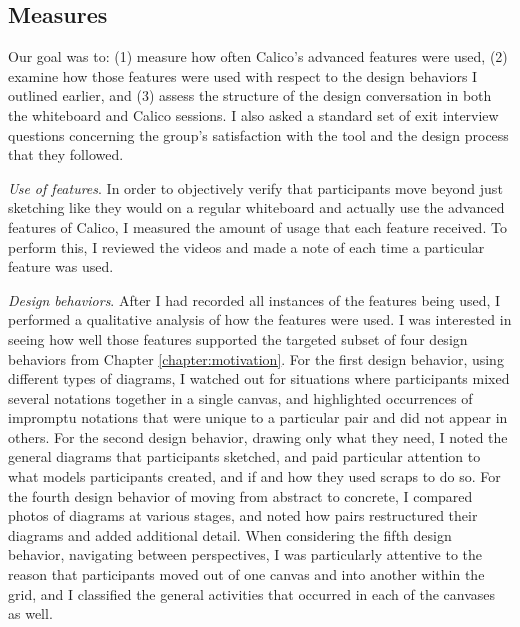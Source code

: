 \documentclass[12pt,fleqn]{ucithesis}
\begin{document}
\subsection {Measures}
\label{experimentaldesign:4}

Our goal was to: (1) measure how often Calico's advanced features were used, (2) examine how those features were used with respect to the design behaviors I outlined earlier, and (3) assess the structure of the design conversation in both the whiteboard and Calico sessions. I also asked a standard set of exit interview questions concerning the group's satisfaction with the tool and the design process that they followed.

    \emph{Use of features}. In order to objectively verify that participants move beyond just sketching like they would on a regular whiteboard and actually use the advanced features of Calico, I measured the amount of usage that each feature received. To perform this, I reviewed the videos and made a note of each time a particular feature was used. 

    \emph{Design behaviors}. After I had recorded all instances of the features being used, I performed a qualitative analysis of how the features were used. I was interested in seeing how well those features supported the targeted subset of four design behaviors from Chapter \ref{chapter:motivation}. For the first design behavior, using different types of diagrams, I watched out for situations where participants mixed several notations together in a single canvas, and highlighted occurrences of impromptu notations that were unique to a particular pair and did not appear in others. For the second design behavior, drawing only what they need, I noted the general diagrams that participants sketched, and paid particular attention to what models participants created, and if and how they used scraps to do so. For the fourth design behavior of moving from abstract to concrete, I compared photos of diagrams at various stages, and noted how pairs restructured their diagrams and added additional detail. When considering the fifth design behavior, navigating between perspectives, I was particularly attentive to the reason that participants moved out of one canvas and into another within the grid, and I classified the general activities that occurred in each of the canvases as well.
\end{document}
